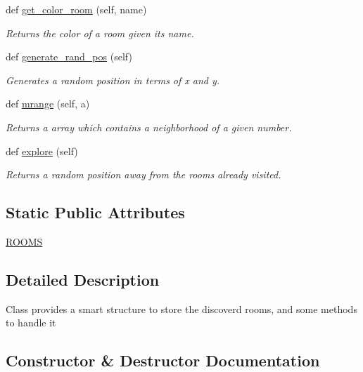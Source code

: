 \begin{DoxyCompactItemize}
def \hyperlink{classRooms_1_1Rooms_aaef9cac25b1cf6e0313868b7e704470e}{get\+\_\+color\+\_\+room} (self, name)
\begin{DoxyCompactList}\small\item\em Returns the color of a room given its name. \end{DoxyCompactList}\item 
def \hyperlink{classRooms_1_1Rooms_a3a531237af143d87bc70927a6ad84865}{generate\+\_\+rand\+\_\+pos} (self)
\begin{DoxyCompactList}\small\item\em Generates a random position in terms of x and y. \end{DoxyCompactList}\item 
def \hyperlink{classRooms_1_1Rooms_ae35a0aa8261fb4ff5c856d80e0f9cac0}{mrange} (self, a)
\begin{DoxyCompactList}\small\item\em Returns a array which contains a neighborhood of a given number. \end{DoxyCompactList}\item 
def \hyperlink{classRooms_1_1Rooms_a031a0e30ceaada375d7b3aacced35668}{explore} (self)
\begin{DoxyCompactList}\small\item\em Returns a random position away from the rooms already visited. \end{DoxyCompactList}\end{DoxyCompactItemize}
\subsection*{Static Public Attributes}
\begin{DoxyCompactItemize}
\item 
\hyperlink{classRooms_1_1Rooms_a45a955141e4dd142491b43124c07ab95}{R\+O\+O\+MS}
\end{DoxyCompactItemize}


\subsection{Detailed Description}
\begin{DoxyVerb}Class provides a smart structure to store the discoverd rooms, and some methods to handle it\end{DoxyVerb}
 

\subsection{Constructor \& Destructor Documentation}

